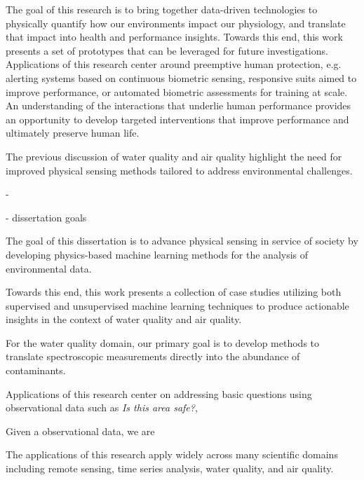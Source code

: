The goal of this research is to bring together data-driven technologies to
physically quantify how our environments impact our physiology, and translate
that impact into health and performance insights. Towards this end, this work
presents a set of prototypes that can be leveraged for future investigations.
Applications of this research center around preemptive human protection, e.g.
alerting systems based on continuous biometric sensing, responsive suits aimed
to improve performance, or automated biometric assessments for training at
scale. An understanding of the interactions that underlie human performance
provides an opportunity to develop targeted interventions that improve
performance and ultimately preserve human life.


The previous discussion of water quality and air quality highlight the need for
improved physical sensing methods tailored to address environmental challenges.

- 

- dissertation goals





The goal of this dissertation is to advance physical sensing in service of
society by developing physics-based machine learning methods for the analysis
of environmental data.

Towards this end, this work presents a collection of case
studies utilizing both supervised and unsupervised machine learning techniques
to produce actionable insights in the context of water quality and air quality.

For the water quality domain, our primary goal is to develop methods to translate
spectroscopic measurements directly into the abundance of contaminants. 


Applications of this research center on addressing basic questions using
observational data such as \textit{Is this area safe?}, 


Given a observational data, we are 

The applications of this research apply widely across many scientific domains
including remote sensing, time series analysis, water quality, and air quality.






